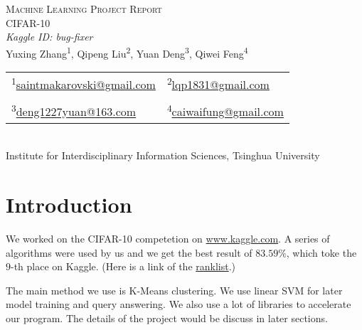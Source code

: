 \documentclass[12pt,abstract=true]{scrartcl}
\newcommand\upper[1]{\textsuperscript#1}
\numberwithin{equation}{section}
\theoremstyle{definition}   \newtheorem{definition}{Definition}[section]
\theoremstyle{plain}        \newtheorem{theorem}{Theorem}[section]
\theoremstyle{plain}        \newtheorem{observation}{Observation}[section]
\theoremstyle{plain}        \newtheorem{fact}{Fact}[section]
\theoremstyle{plain}        \newtheorem{claim}{Claim}[section]
\theoremstyle{plain}        \newtheorem{lemma}[theorem]{Lemma}
\theoremstyle{plain}        \newtheorem{corollary}[theorem]{Corollary}
\theoremstyle{remark}       \newtheorem{example}{Example}[section]
\theoremstyle{remark}       \newtheorem{remark}{Remark}[section]
\newcommand{\scorebest}{$83.59\%$}
\newcommand{\rankbest}{$9$}
\begin{document}
\begin{center} %
	\textsc{
		\LARGE Machine Learning Project Report
	} \\[1em]
	
	\textrm{
		{\Large CIFAR-10}
	} \\[2em]
	
	\textit{
		Kaggle ID: bug-fixer
	} \\[1em]
	
	\normalsize
		Yuxing Zhang\upper{1}, Qipeng Liu\upper{2},
		Yuan Deng\upper{3},	Qiwei Feng\upper{4}\\[1.5em]
	\small
	\begin{tabular}{*{2}{>{\centering}p{}}}
		\upper{1}\small\href{mailto:saintmakarovski@gmail.com}{saintmakarovski@gmail.com} &%
		\upper{2}\href{mailto:lqp1831@gmail.com}{lqp1831@gmail.com}
		\tabularnewline
		\tabularnewline
		\upper{3}\href{mailto:deng1227yuan@163.com}{deng1227yuan@163.com} &
		\upper{4}\href{mailto:caiwaifung@gmail.com}{caiwaifung@gmail.com}
	\end{tabular} \\[1.5em]

	\normalsize Institute for Interdisciplinary Information Sciences,
	Tsinghua University \\[2em]
	
	\normalsize
\end{center} \par %

\tableofcontents
\newpage

\section{Introduction}
	We worked on the CIFAR-10 competetion on
		\href{http://www.kaggle.com/c/cifar-10}{www.kaggle.com}.
	A series of algorithms were used by us and we get the best result of \scorebest,
		which toke the \rankbest-th place on Kaggle.
	(Here is a link of the
		\href{http://www.kaggle.com/c/cifar-10/leaderboard}{ranklist}.)
		
	The main method we use is K-Means clustering.
	We use linear SVM for later model training and query answering.
	We also use a lot of libraries to accelerate our program.
	The details of the project would be discuss in later sections.
	
		
\end{document}
